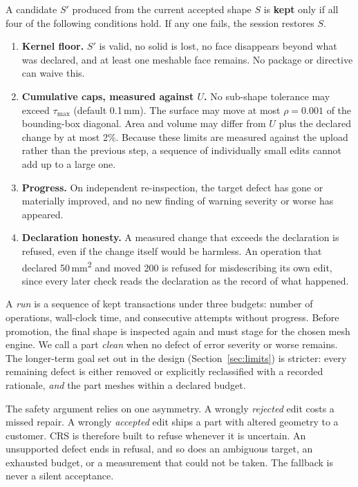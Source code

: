 \documentclass[11pt,onecolumn]{article}
\begin{document}
A candidate $S'$ produced from the current accepted shape $S$ is \textbf{kept} only if all four of
the following conditions hold. If any one fails, the session restores $S$.

\begin{enumerate}
  \item \textbf{Kernel floor.} $S'$ is valid, no solid is lost, no face disappears beyond what was
        declared, and at least one meshable face remains. No package or directive can waive this.
  \item \textbf{Cumulative caps, measured against $U$.} No sub-shape tolerance may exceed
        $\tau_{\max}$ (default 0.1\,mm). The surface may move at most $\rho = 0.001$ of the
        bounding-box diagonal. Area and volume may differ from $U$ plus the declared change by at
        most 2\%. Because these limits are measured against the upload rather than the previous
        step, a sequence of individually small edits cannot add up to a large one.
  \item \textbf{Progress.} On independent re-inspection, the target defect has gone or materially
        improved, and no new finding of warning severity or worse has appeared.
  \item \textbf{Declaration honesty.} A measured change that exceeds the declaration is refused,
        even if the change itself would be harmless. An operation that declared
        50\,mm\textsuperscript{2} and moved 200 is refused for misdescribing its own edit, since
        every later check reads the declaration as the record of what happened.
\end{enumerate}

A \emph{run} is a sequence of kept transactions under three budgets: number of operations,
wall-clock time, and consecutive attempts without progress. Before promotion, the final shape is
inspected again and must stage for the chosen mesh engine. We call a part \emph{clean} when no
defect of error severity or worse remains. The longer-term goal set out in the design
(Section~\ref{sec:limits}) is stricter: every remaining defect is either removed or explicitly
reclassified with a recorded rationale, \emph{and} the part meshes within a declared budget.

The safety argument relies on one asymmetry. A wrongly \emph{rejected} edit costs a missed repair. A
wrongly \emph{accepted} edit ships a part with altered geometry to a customer. CRS is therefore
built to refuse whenever it is uncertain. An unsupported defect ends in refusal, and so does an
ambiguous target, an exhausted budget, or a measurement that could not be taken. The fallback is
never a silent acceptance.
\end{document}
